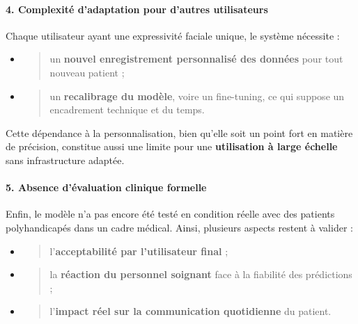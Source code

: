 \documentclass[
]{article}
\begin{document}
\hypertarget{complexituxe9-dadaptation-pour-dautres-utilisateurs}{%
\paragraph{\texorpdfstring{\textbf{4. Complexité d'adaptation pour d'autres utilisateurs}}{4. Complexité d'adaptation pour d'autres utilisateurs}}\label{complexituxe9-dadaptation-pour-dautres-utilisateurs}}

Chaque utilisateur ayant une expressivité faciale unique, le système nécessite :

\begin{itemize}
\item
  \begin{quote}
  un \textbf{nouvel enregistrement personnalisé des données} pour tout nouveau patient ;
  \end{quote}
\item
  \begin{quote}
  un \textbf{recalibrage du modèle}, voire un fine-tuning, ce qui suppose un encadrement technique et du temps.
  \end{quote}
\end{itemize}

Cette dépendance à la personnalisation, bien qu'elle soit un point fort en matière de précision, constitue aussi une limite pour une \textbf{utilisation à large échelle} sans infrastructure adaptée.

\hypertarget{absence-duxe9valuation-clinique-formelle}{%
\paragraph{\texorpdfstring{\textbf{5. Absence d'évaluation clinique formelle}}{5. Absence d'évaluation clinique formelle}}\label{absence-duxe9valuation-clinique-formelle}}

Enfin, le modèle n'a pas encore été testé en condition réelle avec des patients polyhandicapés dans un cadre médical. Ainsi, plusieurs aspects restent à valider :

\begin{itemize}
\item
  \begin{quote}
  l'\textbf{acceptabilité par l'utilisateur final} ;
  \end{quote}
\item
  \begin{quote}
  la \textbf{réaction du personnel soignant} face à la fiabilité des prédictions ;
  \end{quote}
\item
  \begin{quote}
  l'\textbf{impact réel sur la communication quotidienne} du patient.
  \end{quote}
\end{itemize}
\end{document}
